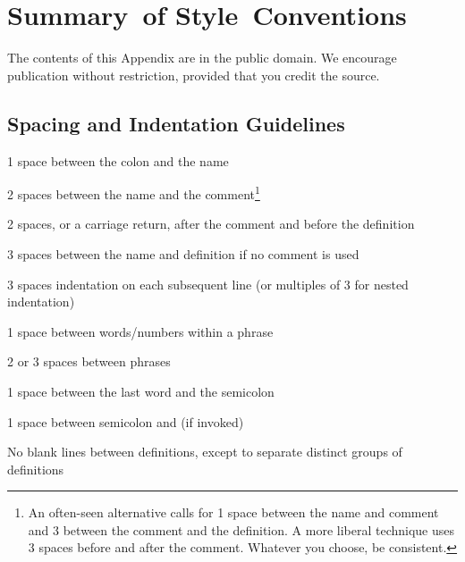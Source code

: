 
\chapter{Summary~of Style~Conventions}

\initialb The contents of this Appendix are in the public domain. We encourage
publication without restriction, provided that you credit the source.

\section{Spacing and Indentation Guidelines}%

\begin{tfquot}
1 space between the colon and the name

2 spaces between the name and the comment\footnote{
An often-seen alternative calls for 1 space between the name and comment
and 3 between the comment and the definition. A more liberal technique
uses 3 spaces before and after the comment. Whatever you choose, be
consistent.}

2 spaces, or a carriage return, after the comment and before the
definition\footnotemark[1]

3 spaces between the name and definition if no comment is used

3 spaces indentation on each subsequent line (or multiples of 3 for nested
indentation)

1 space between words/numbers within a phrase

2 or 3 spaces between phrases

1 space between the last word and the semicolon

1 space between semicolon and  (if invoked)
\end{tfquot}
No blank lines between definitions, except to separate distinct groups of
definitions

